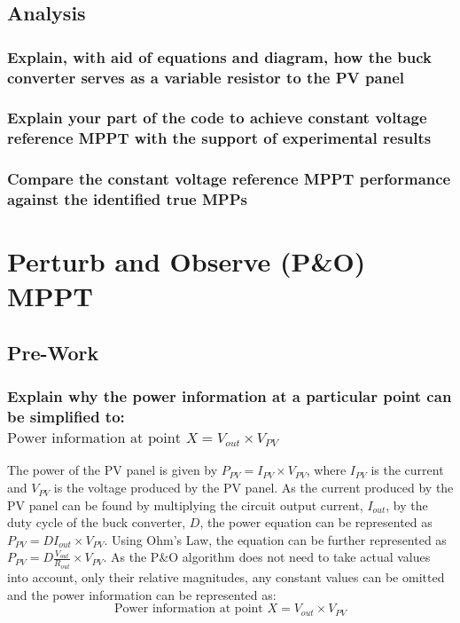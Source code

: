 \documentclass[]{article}
\begin{document}
   		\subsection{Analysis}
   			\subsubsection{Explain, with aid of equations and diagram, how the buck converter serves as a variable resistor to the PV panel}
   			\subsubsection{Explain your part of the code to achieve constant voltage reference MPPT with the support of experimental results}
   			\subsubsection{Compare the constant voltage reference MPPT performance against the identified true MPPs}
   	
   	\section{Perturb and Observe (P\&O) MPPT}
   	    \subsection{Pre-Work}
   	        \subsubsection{Explain why the power information at a particular point can be simplified to:   	        \\$\text{Power information at point } X = V_{out} \times V_{PV}$} \label{sssec:Powerinfo}
   	            The power of the PV panel is given by $P_{PV} = I_{PV} \times V_{PV}$, where $I_{PV}$ is the current and $V_{PV}$ is the voltage produced by the PV panel. As the current produced by the PV panel can be found by multiplying the circuit output current, $I_{out}$, by the duty cycle of the buck converter, $D$, the power equation can be represented as $P_{PV} = D I_{out} \times V_{PV}$. Using Ohm's Law, the equation can be further represented as $P_{PV} = D \frac{V_{out}}{R_{out}} \times V_{PV}$. As the P\&O algorithm does not need to take actual values into account, only their relative magnitudes, any constant values can be omitted and the power information can be represented as:
   	            \begin{equation*}
   	                \text{Power information at point } X = V_{out} \times V_{PV}
   	            \end{equation*}
   	            
\end{document}
